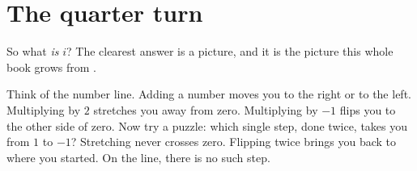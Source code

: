 \section{The quarter turn}\label{sec:quarter-turn}

So what \emph{is} $i$? The clearest answer is a picture, and it is the picture this whole book grows from \citep{MokhithiShock2020,Needham1997}.

Think of the number line. Adding a number moves you to the right or to the left. Multiplying by $2$ stretches you away from zero. Multiplying by $-1$ flips you to the other side of zero. Now try a puzzle: which single step, done twice, takes you from $1$ to $-1$? Stretching never crosses zero. Flipping twice brings you back to where you started. On the line, there is no such step.

